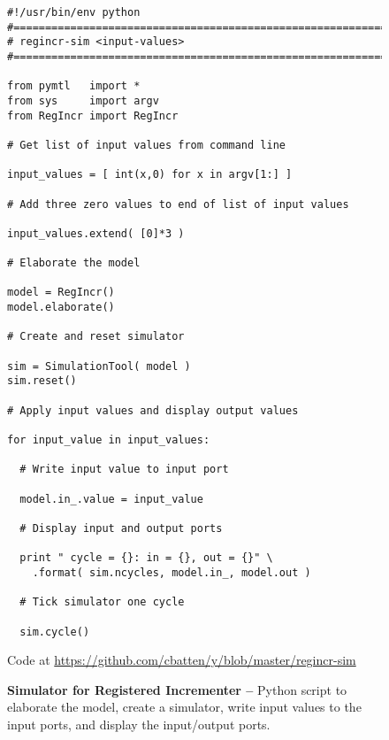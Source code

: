 
\begin{figure}

  \begin{lstlisting}[xleftmargin={0.9in}]
#!/usr/bin/env python
#=========================================================================
# regincr-sim <input-values>
#=========================================================================

from pymtl   import *
from sys     import argv
from RegIncr import RegIncr

# Get list of input values from command line

input_values = [ int(x,0) for x in argv[1:] ]

# Add three zero values to end of list of input values

input_values.extend( [0]*3 )

# Elaborate the model

model = RegIncr()
model.elaborate()

# Create and reset simulator

sim = SimulationTool( model )
sim.reset()

# Apply input values and display output values

for input_value in input_values:

  # Write input value to input port

  model.in_.value = input_value

  # Display input and output ports

  print " cycle = {}: in = {}, out = {}" \
    .format( sim.ncycles, model.in_, model.out )

  # Tick simulator one cycle

  sim.cycle()
\end{lstlisting}

  \centerline{\small Code at
    \url{https://github.com/cbatten/y/blob/master/regincr-sim}}

  \caption{\textbf{Simulator for Registered Incrementer --} Python script
    to elaborate the model, create a simulator, write input values to the
    input ports, and display the input/output ports.}
  \label{code-tut3-regincr-sim}

\end{figure}


